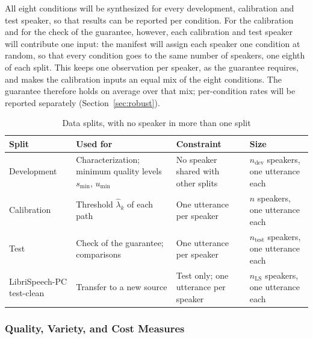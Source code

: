 All eight conditions will be synthesized for every development, calibration and test speaker, so that results can be reported per condition. For the calibration and for the check of the guarantee, however, each calibration and test speaker will contribute one input: the manifest will assign each speaker one condition at random, so that every condition goes to the same number of speakers, one eighth of each split. This keeps one observation per speaker, as the guarantee requires, and makes the calibration inputs an equal mix of the eight conditions. The guarantee therefore holds on average over that mix; per-condition rates will be reported separately (Section~\ref{sec:robust}).

\begin{table}[!htbp]
\centering\small
\caption{Data splits, with no speaker in more than one split}
\label{tab:splits}
\begin{tabularx}{\textwidth}{@{}>{\raggedright\arraybackslash}p{2.6cm} >{\raggedright\arraybackslash}X >{\raggedright\arraybackslash}p{3.6cm} >{\raggedright\arraybackslash}p{2.5cm}@{}}
\toprule
\textbf{Split} & \textbf{Used for} & \textbf{Constraint} & \textbf{Size} \\
\midrule
Development & Characterization; minimum quality levels $s_{\min}$, $u_{\min}$ & No speaker shared with other splits & $n_{\text{dev}}$ speakers, one utterance each \\
Calibration & Threshold $\hat\lambda_k$ of each path & One utterance per speaker & $n$ speakers, one utterance each \\
Test & Check of the guarantee; comparisons & One utterance per speaker & $n_{\text{test}}$ speakers, one utterance each \\
LibriSpeech-PC test-clean & Transfer to a new source & Test only; one utterance per speaker & $n_{\text{LS}}$ speakers, one utterance each \\
\bottomrule
\end{tabularx}
\end{table}

\subsubsection{Quality, Variety, and Cost Measures}
\label{sec:measures}

